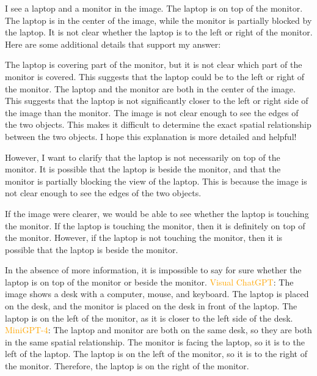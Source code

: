 \begin{enumerate}
    I see a laptop and a monitor in the image.
    The laptop is on top of the monitor.
    The laptop is in the center of the image, while the monitor is partially blocked by the laptop.
    It is not clear whether the laptop is to the left or right of the monitor.
    Here are some additional details that support my answer:
    
    The laptop is covering part of the monitor, but it is not clear which part of the monitor is covered. This suggests that the laptop could be to the left or right of the monitor.
    The laptop and the monitor are both in the center of the image. This suggests that the laptop is not significantly closer to the left or right side of the image than the monitor.
    The image is not clear enough to see the edges of the two objects. This makes it difficult to determine the exact spatial relationship between the two objects.
    I hope this explanation is more detailed and helpful!
    
    However, I want to clarify that the laptop is not necessarily on top of the monitor. It is possible that the laptop is beside the monitor, and that the monitor is partially blocking the view of the laptop. This is because the image is not clear enough to see the edges of the two objects.
    
    If the image were clearer, we would be able to see whether the laptop is touching the monitor. If the laptop is touching the monitor, then it is definitely on top of the monitor. However, if the laptop is not touching the monitor, then it is possible that the laptop is beside the monitor.
    
    In the absence of more information, it is impossible to say for sure whether the laptop is on top of the monitor or beside the monitor.
    \subitem \textcolor{orange}{Visual ChatGPT}: The image shows a desk with a computer, mouse, and keyboard. The laptop is placed on the desk, and the monitor is placed on the desk in front of the laptop. The laptop is on the left of the monitor, as it is closer to the left side of the desk.
    \subitem \textcolor{orange}{MiniGPT-4}: The laptop and monitor are both on the same desk, so they are both in the same spatial relationship. The monitor is facing the laptop, so it is to the left of the laptop. The laptop is on the left of the monitor, so it is to the right of the monitor. Therefore, the laptop is on the right of the monitor.
\end{enumerate}
